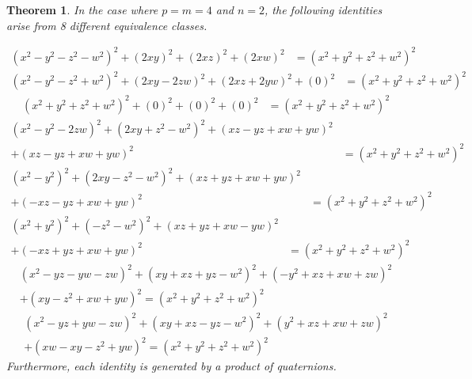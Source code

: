\documentclass[12pt,table]{article}
\newtheorem{theorem}{Theorem}[section]
\theoremstyle{definition}
\theoremstyle{remark}
\numberwithin{equation}{section}
\begin{document}
\begin{theorem}
\label{theorem_8_classes}
In the case where  $p = m = 4$ and $n = 2$,
the following identities 
arise from 8 different
equivalence classes.

\begin{align}
\label{Identity_1}
    (x^2 - y^2 - z^2 - w^2 )^2 + (2xy)^2 + (2xz)^2 + (2xw)^2 
    &= (x^2 + y^2 + z^2 + w^2)^2 
\end{align}
\begin{align}
\label{Identity_2}
    (x^2 - y^2 - z^2 + w^2 )^2 + (2xy - 2zw)^2 + (2xz + 2yw)^2 + (0)^2 
    &= (x^2 + y^2 + z^2 + w^2)^2
\end{align}
\begin{align}
\label{Identity_3}
    (x^2 + y^2 + z^2 + w^2 )^2 + (0)^2 + (0)^2 + (0)^2 
    &= (x^2 + y^2 + z^2 + w^2)^2
\end{align}
\begin{align}
\label{Identity_4}
    (x^2 - y^2 - 2zw )^2 + (2xy + z^2 - w^2)^2 
    + (xz - yz + xw + yw)^2\nonumber
    \\
    + (xz - yz + xw + yw)^2 
        &= (x^2 + y^2 + z^2 + w^2)^2
\end{align}
\begin{align}
\label{Identity_5}
    (x^2 - y^2 )^2 + (2xy - z^2 - w^2)^2 
        + (xz + yz + xw + yw)^2 \nonumber
        \\
        + (-xz - yz + xw + yw)^2 
    &= (x^2 + y^2 + z^2 + w^2)^2
\end{align}
\begin{align}
\label{Identity_6}
    (x^2 + y^2 )^2 + (- z^2 - w^2)^2 
        + (xz + yz + xw - yw)^2  \nonumber
        \\
      + (-xz + yz + xw + yw)^2
    &= (x^2 + y^2 + z^2 + w^2)^2
\end{align}
\begin{align}
\label{Identity_7}
    (x^2 - yz - yw - zw )^2 + (xy + xz + yz - w^2)^2 
        + (-y^2 + xz + xw + zw)^2 \nonumber
        \\
        + (xy - z^2 + xw + yw)^2 
    = (x^2 + y^2 + z^2 + w^2)^2
\end{align}
\begin{align}
\label{Identity_8}
    (x^2 - yz + yw - zw )^2 + (xy + xz - yz - w^2)^2 
        + (y^2 + xz + xw + zw)^2 \nonumber
        \\
        + (xw - xy - z^2  + yw)^2 
            = (x^2 + y^2 + z^2 + w^2)^2
\end{align}
Furthermore, each identity
is generated by a product of quaternions. 
\end{theorem}
\end{document}
